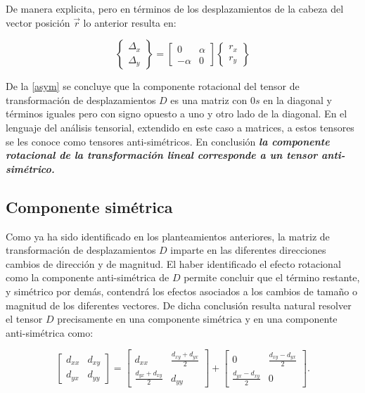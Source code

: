 \documentclass[../notas medios.tex]{subfiles}
\begin{document}
De manera explicita, pero en términos de los desplazamientos de la cabeza del vector posición $\vec{r}$ lo anterior resulta en:

\begin{equation}
\left\{ {\begin{array}{*{20}{c}}
{{\Delta _x}}\\
{{\Delta _y}}
\end{array}} \right\} = \left[ {\begin{array}{*{20}{c}}
0&\alpha \\
{ - \alpha }&0
\end{array}} \right]\left\{ {\begin{array}{*{20}{c}}
{{r_x}}\\
{{r_y}}
\end{array}} \right\}
\label{asym}
\end{equation}

De la \cref{asym} se concluye que la componente rotacional del tensor de transformación de desplazamientos $D$ es una matriz con $0s$ en la diagonal y términos iguales pero con signo opuesto a uno y otro lado de la diagonal. En el lenguaje del análisis tensorial, extendido en este caso a matrices, a estos tensores se les conoce como tensores anti-simétricos. En conclusión \textbf{\textit{la componente rotacional de la transformación lineal corresponde a un tensor anti-simétrico.}}


\subsection{Componente simétrica}
Como ya ha sido identificado en los planteamientos anteriores, la matriz de transformación de desplazamientos $D$ imparte en las diferentes direcciones cambios de dirección y de magnitud. El haber identificado el efecto rotacional como la componente anti-simétrica de $D$ permite concluir que el término restante, y simétrico por demás, contendrá los efectos asociados a los cambios de tamaño o magnitud de los diferentes vectores. De dicha conclusión resulta natural resolver el tensor $D$ precisamente en una componente simétrica y en una componente anti-simétrica como:


\begin{equation}
\left[ {\begin{array}{*{20}{c}}
{{d_{xx}}}&{{d_{xy}}}\\
{{d_{yx}}}&{{d_{yy}}}
\end{array}} \right] = \left[ {\begin{array}{*{20}{c}}
{{d_{xx}}}&{\frac{{{d_{xy}} + {d_{yx}}}}{2}}\\
{\frac{{{d_{yx}} + {d_{xy}}}}{2}}&{{d_{yy}}}
\end{array}} \right] + \left[ {\begin{array}{*{20}{c}}
0&{\frac{{{d_{xy}} - {d_{yx}}}}{2}}\\
{\frac{{{d_{yx}} - {d_{xy}}}}{2}}&0
\end{array}} \right].
\label{descomp}
\end{equation}
\end{document}

